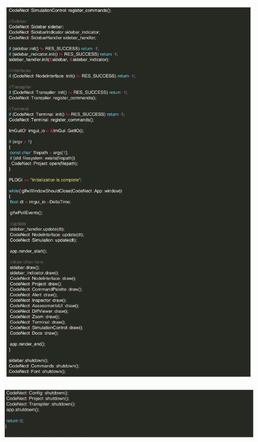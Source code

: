 \begin{figure}[H]
	 \centering
	 \includegraphics[width=\textwidth]{figures/code/main-2.png}
\end{figure}
\begin{figure}[H]
	 \centering
	 \includegraphics[width=\textwidth]{figures/code/main-3.png}
\end{figure}

